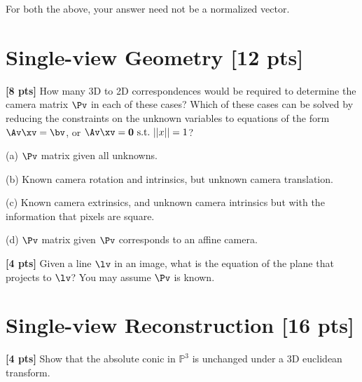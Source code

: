 \documentclass[11pt,addpoints,answers]{exam}
\numberwithin{equation}{section} %
\numberwithin{figure}{section} %
\numberwithin{table}{section} %
\begin{document}
\begin{questions}
For both the above, your answer need not be a normalized vector.

\begin{tcolorbox}[fit,height=18cm, width=\textwidth, blank, borderline={0.5pt}{-2pt},halign=left, valign=center, nobeforeafter]


\end{tcolorbox}


\section{Single-view Geometry [12 pts]}

\question \textbf{[8 pts]} How many 3D to 2D correspondences would be required to determine the camera matrix $\Pv$ in each of these cases? Which of these cases can be solved by reducing the constraints on the unknown variables to equations of the form $\Av\xv=\bv$, or $\Av\xv=\mathbf{0}~\text{s.t.}~||x||=1$?

(a) $\Pv$ matrix given all unknowns.

(b) Known camera rotation and intrinsics, but unknown camera translation.

(c) Known camera extrinsics, and unknown camera intrinsics but with the information that pixels are square.

(d) $\Pv$ matrix given $\Pv$ corresponds to an affine camera.

\begin{tcolorbox}[fit,height=16.5cm, width=\textwidth, blank, borderline={0.5pt}{-2pt},halign=left, valign=center, nobeforeafter]


\end{tcolorbox}

\question \textbf{[4 pts]} Given a line $\lv$ in an image, what is the equation of the plane that projects to $\lv$? You may assume $\Pv$ is known.

\begin{tcolorbox}[fit,height=9.5cm, width=\textwidth, blank, borderline={0.5pt}{-2pt},halign=left, valign=center, nobeforeafter]


\end{tcolorbox}

\section{Single-view Reconstruction [16 pts]}

\question \textbf{[4 pts]} Show that the absolute conic in $\mathbb{P}^3$ is unchanged under a 3D euclidean transform.


\end{questions}
\end{document}
